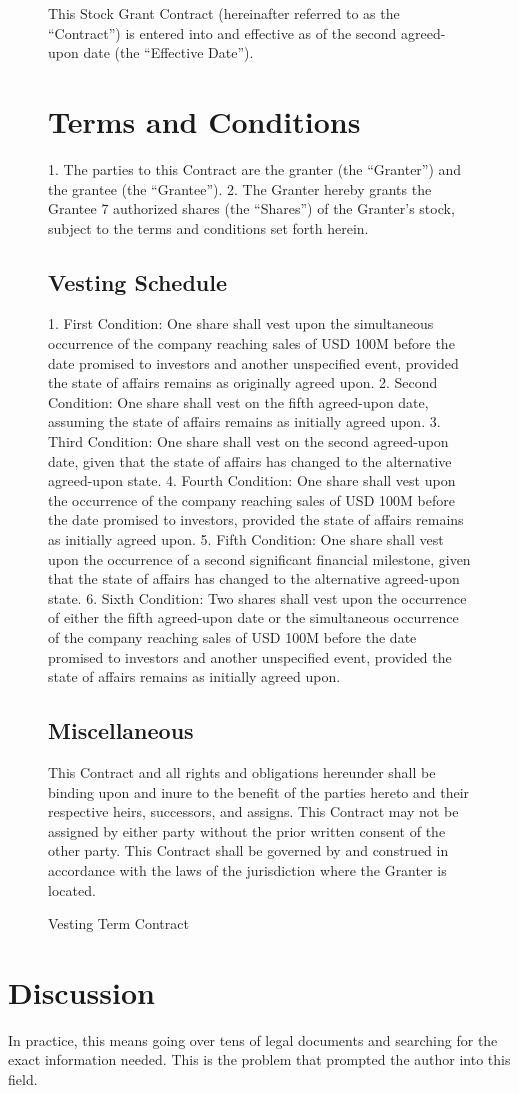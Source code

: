 \begin{figure}[H]\label{fig:vs:contract}
	\begin{minipage}{\linewidth}
		This Stock Grant Contract (hereinafter referred to as the ``Contract'') is entered into and effective as of the second agreed-upon date (the ``Effective Date'').

		\section*{Terms and Conditions}

		1. The parties to this Contract are the granter (the ``Granter'') and the grantee (the ``Grantee'').
		2. The Granter hereby grants the Grantee 7 authorized shares (the ``Shares'') of the Granter's stock, subject to the terms and conditions set forth herein.

		\subsection*{Vesting Schedule}

		1. First Condition: One share shall vest upon the simultaneous occurrence of the company reaching sales of USD 100M before the date promised to investors and another unspecified event, provided the state of affairs remains as originally agreed upon.
		2. Second Condition: One share shall vest on the fifth agreed-upon date, assuming the state of affairs remains as initially agreed upon.
		3. Third Condition: One share shall vest on the second agreed-upon date, given that the state of affairs has changed to the alternative agreed-upon state.
		4. Fourth Condition: One share shall vest upon the occurrence of the company reaching sales of USD 100M before the date promised to investors, provided the state of affairs remains as initially agreed upon.
		5. Fifth Condition: One share shall vest upon the occurrence of a second significant financial milestone, given that the state of affairs has changed to the alternative agreed-upon state.
		6. Sixth Condition: Two shares shall vest upon the occurrence of either the fifth agreed-upon date or the simultaneous occurrence of the company reaching sales of USD 100M before the date promised to investors and another unspecified event, provided the state of affairs remains as initially agreed upon.

		\subsection*{Miscellaneous}

		This Contract and all rights and obligations hereunder shall be binding upon and inure to the benefit of the parties hereto and their respective heirs, successors, and assigns. This Contract may not be assigned by either party without the prior written consent of the other party. This Contract shall be governed by and construed in accordance with the laws of the jurisdiction where the Granter is located.
	\end{minipage}
	\caption{Vesting Term Contract}
\end{figure}

\section{Discussion}

In practice, this means going over tens of legal documents and searching for the exact information needed. This is the problem that prompted the author into this field.